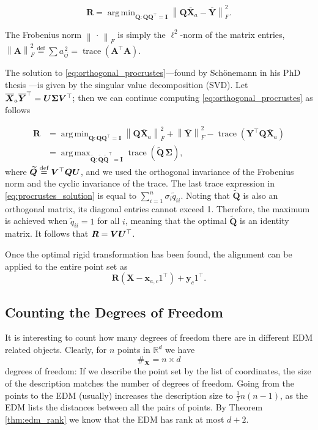 \documentclass[10pt,double]{IEEEtran}
\providecommand{\R}{\ensuremath{\mathbb{R}}}
\providecommand{\norm}[1]{\left\lVert#1\right\rVert}
\providecommand{\bydef}{\overset{\text{def}}{=}}
\renewcommand{\vec}[1]{\ensuremath{\boldsymbol{#1}}}
\providecommand{\mat}[1]{\ensuremath{\boldsymbol{#1}}}
\providecommand{\wt}[1]{\ensuremath{\widetilde{#1}}}
\providecommand{\mA}{\mat{A}} \providecommand{\mB}{\mat{B}}
\providecommand{\mI}{\mat{I}} \providecommand{\mJ}{\mat{J}}
\providecommand{\mQ}{\mat{Q}} \providecommand{\mR}{\mat{R}}
\providecommand{\mV}{\mat{V}} \providecommand{\mT}{\mat{T}}
\providecommand{\mSigma}{\mat{\Sigma}}
\providecommand{\mX}{\mat{X}}\providecommand{\mY}{\mat{Y}}
\providecommand{\vx}{\vec{x}} \providecommand{\vy}{\vec{y}}
\newcommand{\vone}{\ensuremath{\vec{\mathit{1}}}}
\newcommand{\T}{\ensuremath{\top}}
\newcommand{\trace}{\ensuremath{\mathop{\mathrm{trace}}}}
\DeclareMathOperator*{\argmin}{arg\,min}
\DeclareMathOperator*{\argmax}{arg\,max}
\newcommand{\rev}[1]{{#1}}
\begin{document}
\begin{equation}
	\label{eq:orthogonal_procrustes}
	\mR = \argmin_{\mQ:\mQ \mQ^\T = \mI} \norm{\mQ \overline{\mX}_a - \overline{\mY}}_F^2.
\end{equation}
\rev{The Frobenius norm $\norm{\,\cdot\,}_F$ is simply the $\ell^2$-norm of
the matrix entries, $\norm{\mA}_F^2 \bydef \sum
a_{ij}^{\,2} = \trace(\mA^\T \mA)$. 

The solution to
\eqref{eq:orthogonal_procrustes}---found by Sch\"onemann in his PhD thesis
\cite{Schonemann:1964tj}---is given by the singular value decomposition (SVD).
Let $\overline{\mX}_a \overline{\mY}^\T = \mU
\mSigma \mV^\T$; then we can continue computing
\eqref{eq:orthogonal_procrustes} as follows 

\begin{align}
  \label{eq:procrustes_solution}
  \mR
  &= \argmin_{\mQ:\mQ \mQ^\T = \mI}  \norm{\mQ \overline{\mX}_a}_F^2 + \norm{\overline{\mY}}_F^2 - \trace(\mY^\T \mQ \overline{\mX}_a)  \nonumber \\
  &= \argmax_{\wt{\mQ}:\wt{\mQ} \wt{\mQ}^\T = \mI}  \trace(\wt{\mQ} \, \mSigma), 
\end{align}
where $\wt{\mQ} \bydef \mV^\T \mQ \mU$, and we used the orthogonal invariance
of the Frobenius norm and the cyclic invariance of the trace. The
last trace expression in \eqref{eq:procrustes_solution} is equal to
$\sum_{i=1}^n  \sigma_i \wt{q}_{ii}$. Noting that $\wt{\mQ}$ is also an
orthogonal matrix, its diagonal entries cannot exceed 1. Therefore, the
maximum is achieved when $\wt{q}_{ii} = 1$ for all $i$, meaning that the
optimal $\wt{\mQ}$ is an identity matrix. It follows that $\mR = \mV
\mU^\T$. 

Once the optimal rigid transformation has been found, the alignment can be
applied to the entire point set as
\begin{equation}
	\mR (\mX - \vx_{a,c} \vone^\T) + \vy_c \vone^\T.
\end{equation}
}

\subsection{Counting the Degrees of Freedom}

It is interesting to count how many degrees of freedom there are in different
EDM related objects. Clearly, for $n$ points in $\R^d$ we have
\begin{equation}
	\#_{\mX} = n \times d
\end{equation}
degrees of freedom: If we describe the point set by the list of coordinates,
the size of the description matches the number of degrees of freedom. Going
from the points to the EDM (usually) increases the description size to
$\frac{1}{2}{n(n-1)}$, as the EDM lists the distances between all the pairs of
points. 
By Theorem \ref{thm:edm_rank} we know that the EDM has
rank at most $d+2$.
\end{document}
